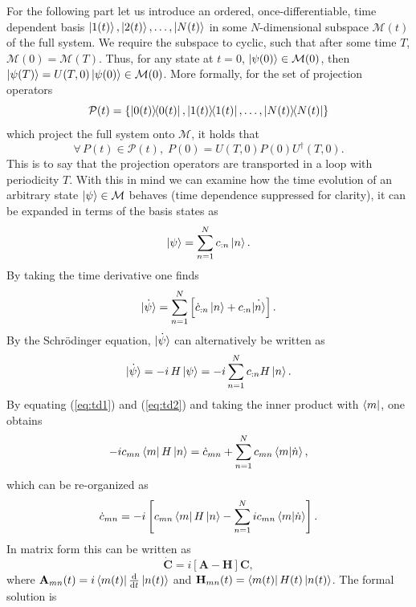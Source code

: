 For the following part let us introduce an ordered, once-differentiable, time dependent basis $\ket{1(t)}, \ket{2(t)},\dots, \ket{N(t)}$ in some $N$-dimensional subspace $\mathcal{M}(t)$ of the full system. We require the subspace to cyclic, such that after some time $T$, $\mathcal{M}(0) = \mathcal{M}(T)$. Thus, for any state at $t=0$, $\ket{\psi(0)} \in \mathcal{M}(0)$, then $\ket{\psi(T)} = U(T,0)\ket{\psi(0)} \in \mathcal{M}(0)$. More formally, for the set of projection operators $$\mathcal{P}(t) = \{\ketbra{0(t)}{0(t)}, \ketbra{1(t)}{1(t)}, \dots, \ketbra{N(t)}{N(t)} \}$$
which project the full system onto $\mathcal{M}$, it holds that 
$$\forall\,P(t) \in \mathcal{P}(t),\; P(0) = U(T,0)P(0)U^\dagger(T,0). $$
This is to say that the projection operators are transported in a loop with periodicity $T$. With this in mind we can examine how the time evolution of an arbitrary state $\ket{\psi} \in \mathcal{M}$ behaves (time dependence suppressed for clarity), it can be expanded in terms of the basis states as
\begin{equation}
\ket{\psi} = \sum_{n = 1}^N c_{:n}\ket{n}.
\end{equation}
By taking the time derivative one finds
\begin{equation}
\label{eq:td1}
\dot{\ket{\psi}} = \sum_{n = 1}^N \left[\dot{c}_{:n}\ket{n} + c_{:n}\dot{\ket{n}} \right].
\end{equation}
By the Schrödinger equation, $\dot{\ket{\psi}}$ can alternatively be written as
\begin{equation}
\label{eq:td2}
\dot{\ket{\psi}} = -i\,H\ket{\psi} = -i\sum_{n = 1}^N c_{:n}H\ket{n}.
\end{equation}
By equating (\ref{eq:td1}) and (\ref{eq:td2}) and taking the inner product with $\bra{m}$, one obtains
\begin{equation}
-i c_{mn}\bra{m}H\ket{n} = \dot{c}_{mn} + \sum_{n = 1}^N c_{mn} \bra{m}\ket{\dot{n}},
\end{equation}
which can be re-organized as  
\begin{equation}
\dot{c}_{mn} = -i\left[c_{mn}\bra{m}H\ket{n} - \sum_{n = 1}^N i c_{mn} \bra{m}\ket{\dot{n}} \right].
\end{equation}
In matrix form this can be written as 
\begin{equation}
\dot{\mathbf{C}} = i\left[\mathbf{A} - \mathbf{H} \right]\mathbf{C},
\end{equation}
where $\mathbf{A}_{mn}(t) = i\bra{m(t)}\dv{}{t}\ket{n(t)}$ and
$\mathbf{H}_{mn}(t) = \bra{m(t)}H(t)\ket{n(t)}$. The formal solution is 
